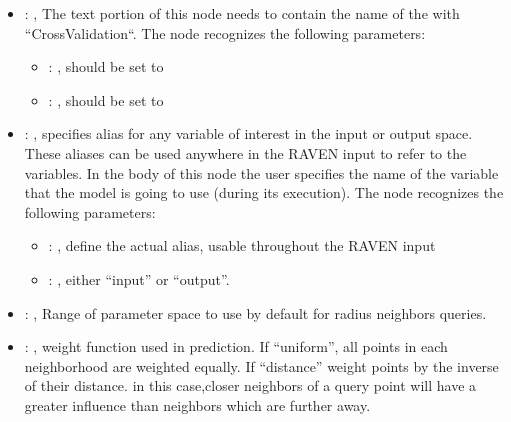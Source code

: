 \begin{itemize}
\begin{itemize}
        \item {}: ,
          List of IDs of features/variables to include in the transformation process.

        \item {}: ,
          Which space to search? Target or Feature?
      \end{itemize}

    \item {}: ,
      The text portion of this node needs to contain the name of the  with
               ``CrossValidation``.
      The  node recognizes the following parameters:
        \begin{itemize}
          \item {}: ,
            should be set to 
          \item {}: ,
            should be set to 
      \end{itemize}

    \item {}: ,
      specifies alias for         any variable of interest in the input or output space. These
      aliases can be used anywhere in the RAVEN input to         refer to the variables. In the body
      of this node the user specifies the name of the variable that the model is going to use
      (during its execution).
      The  node recognizes the following parameters:
        \begin{itemize}
          \item {}: ,
            define the actual alias, usable throughout the RAVEN input
          \item {}: ,
            either ``input'' or ``output''.
      \end{itemize}

    \item {}: ,
      Range of parameter space to use by default for radius neighbors queries.

    \item {}: ,
      weight function used in prediction. If ``uniform'', all points in each neighborhood
      are weighted equally. If ``distance'' weight points by the inverse of their distance. in this
      case,closer neighbors of a query point will have a greater influence than neighbors which are
      further away.


\end{itemize}
